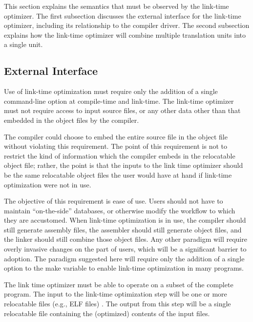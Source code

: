 This section explains the semantics that must be observed by the
link-time optimizer.  The first subsection discusses the external
interface for the link-time optimizer, including its relationship to
the compiler driver.  The second subsection explains how the link-time
optimizer will combine multiple translation units into a single unit.

\subsection{External Interface}

\begin{requirement}
 Use of link-time optimization must require only the addition of a
 single command-line option at compile-time and link-time.  The
 link-time optimizer must not require access to input source files, or
 any other data other than that embedded in the object files by the
 compiler.
\end{requirement}

\begin{note}
  The compiler could choose to embed the entire source file in the
  object file without violating this requirement.  The point of this
  requirement is not to restrict the kind of information which the
  compiler embeds in the relocatable object file; rather, the point is
  that the inputs to the link time optimizer should be the same
  relocatable object files the user would have at hand if link-time
  optimization were not in use.
\end{note}

\begin{rationale}
  The objective of this requirement is ease of use.  Users should not
  have to maintain ``on-the-side'' databases, or otherwise 
  modify the workflow to which they are accustomed.  When link-time
  optimization is in use, the compiler should still generate assembly
  files, the assembler should still generate object files, and the
  linker should still combine those object files.  Any other paradigm
  will require overly invasive changes on the part of users, which
  will be a significant barrier to adoption.  The paradigm suggested
  here will require only the addition of a single option to the 
   make variable to enable link-time optimization in many
  programs.
\end{rationale}

\begin{requirement}
  The link time optimizer must be able to operate on a subset of the
  complete program.  The input to the link-time optimization step will
  be one or more relocatable files (e.g., ELF  files) .
  The output from this step will be a single relocatable file
  containing the (optimized) contents of the input files.
\end{requirement}

